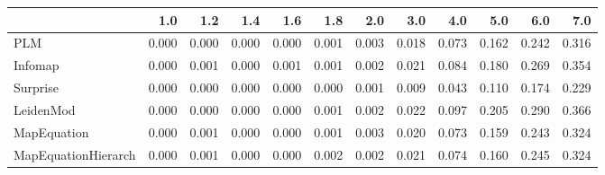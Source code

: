 \begin{tabular}{lrrrrrrrrrrr}
\toprule
{} &   1.0 &   1.2 &   1.4 &   1.6 &   1.8 &   2.0 &   3.0 &   4.0 &   5.0 &   6.0 &   7.0 \\
\midrule
PLM                 & 0.000 & 0.000 & 0.000 & 0.000 & 0.001 & 0.003 & 0.018 & 0.073 & 0.162 & 0.242 & 0.316 \\
Infomap             & 0.000 & 0.001 & 0.000 & 0.001 & 0.001 & 0.002 & 0.021 & 0.084 & 0.180 & 0.269 & 0.354 \\
Surprise            & 0.000 & 0.000 & 0.000 & 0.000 & 0.000 & 0.001 & 0.009 & 0.043 & 0.110 & 0.174 & 0.229 \\
LeidenMod           & 0.000 & 0.000 & 0.000 & 0.000 & 0.001 & 0.002 & 0.022 & 0.097 & 0.205 & 0.290 & 0.366 \\
MapEquation         & 0.000 & 0.001 & 0.000 & 0.000 & 0.001 & 0.003 & 0.020 & 0.073 & 0.159 & 0.243 & 0.324 \\
MapEquationHierarch & 0.000 & 0.001 & 0.000 & 0.000 & 0.002 & 0.002 & 0.021 & 0.074 & 0.160 & 0.245 & 0.324 \\
\bottomrule
\end{tabular}
